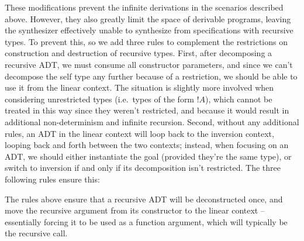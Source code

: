 \documentclass{llncs}
\newcommand{\bang}{{!}}
\def\Rho{P}
\begin{document}
These modifications prevent the infinite derivations in the scenarios
described above. However, they also greatly limit the space of
derivable programs, leaving the synthesizer effectively unable to
synthesize from specifications with recursive types. To prevent this,
so we add three rules to complement the restrictions on construction
and destruction of recursive types.
%
First, after decomposing a recursive ADT, we must consume
 all constructor parameters, and since we
can't decompose the self type any further because of a restriction, we
should be able to use it from the linear context. The situation is
slightly more involved when considering unrestricted types (i.e.~types
of the form $\bang A$), which cannot be treated in this way since they
weren't restricted, and because it would result in additional
non-determinism and infinite recursion. 
%
Second, without any additional rules, an ADT in the linear context
will loop back to the inversion context, looping back and forth
between the two contexts; instead, when focusing on an ADT, we should
either instantiate the goal (provided they're the same type), or switch
to inversion if and only if its decomposition isn't restricted. The
three following rules ensure this:
%
The rules above ensure that a recursive ADT will be deconstructed
once, and move the recursive argument from its constructor to the
linear context -- essentially forcing it to be used as a function
argument, which will typically be the recursive call.
\end{document}
